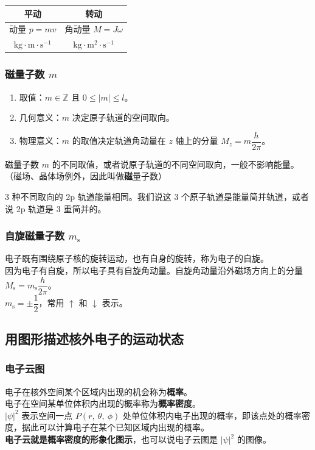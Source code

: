 \begin{table}[h]
    \centering
    \begin{tabular}{|c|c|}
        \hline
        \textbf{平动} & \textbf{转动} \\
        \hline
        动量 $p = mv$ & 角动量 $M = J \omega$ \\
        $\mathrm{kg \cdot m \cdot s^{-1}}$ & $\mathrm{kg \cdot m^2 \cdot s^{-1}}$ \\
        \hline
    \end{tabular}
\end{table}

\subsubsection{磁量子数 $m$}
\begin{enumerate}
    \item 取值：$m \in \mathbb{Z}$ 且 $0 \leqslant \left| m \right| \leqslant l$。
    \item 几何意义：$m$ 决定原子轨道的空间取向。
    \item 物理意义：$m$ 的取值决定轨道角动量在 $z$ 轴上的分量 $M_{z}= m \dfrac{h}{2\pi}$。
\end{enumerate}
磁量子数 $m$ 的不同取值，或者说原子轨道的不同空间取向，一般不影响能量。（磁场、晶体场例外，因此叫做\textbf{磁}量子数）

3 种不同取向的 2p 轨道能量相同。我们说这 3 个原子轨道是能量简并轨道，或者说 2p 轨道是 3 重简并的。

\subsubsection{自旋磁量子数 $m_\mathrm{s}$}
电子既有围绕原子核的旋转运动，也有自身的旋转，称为电子的自旋。\\
因为电子有自旋，所以电子具有自旋角动量。自旋角动量沿外磁场方向上的分量 $M_\mathrm{s} = m_\mathrm{s}\dfrac{h}{2\pi}$。\\
$m_\mathrm{s} = \pm \dfrac{1}{2}$，常用 $\uparrow$ 和 $\downarrow$ 表示。

\subsection{用图形描述核外电子的运动状态}

\subsubsection{电子云图}
电子在核外空间某个区域内出现的机会称为\textbf{概率}。\\
电子在空间某单位体积内出现的概率称为\textbf{概率密度}。\\
$\left| \psi \right| ^2$ 表示空间一点 $P(r,~\theta,~\phi)$ 处单位体积内电子出现的概率，即该点处的概率密度，据此可以计算电子在某个已知区域内出现的概率。\\
\textbf{电子云就是概率密度的形象化图示}，也可以说电子云图是 $\left| \psi \right| ^2$ 的图像。

